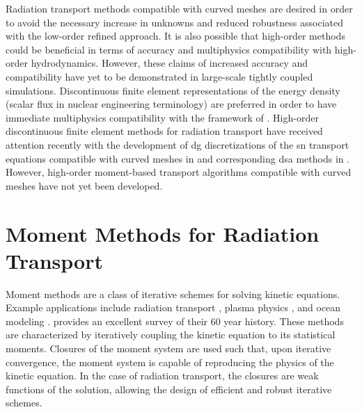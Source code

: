 \documentclass[../doc.tex]{subfiles}
\begin{document}
Radiation transport methods compatible with curved meshes are desired in order to avoid the necessary increase in unknowns and reduced robustness associated with the low-order refined approach. It is also possible that high-order methods could be beneficial in terms of accuracy and multiphysics compatibility with high-order hydrodynamics. However, these claims of increased accuracy and compatibility have yet to be demonstrated in large-scale tightly coupled simulations. Discontinuous finite element representations of the energy density (scalar flux in nuclear engineering terminology) are preferred in order to have immediate multiphysics compatibility with the framework of \cite{blast}. High-order discontinuous finite element methods for radiation transport have received attention recently with the development of \gls{dg} discretizations of the \gls{sn} transport equations compatible with curved meshes in \cite{graph_sweeps,woods_thesis} and corresponding \gls{dsa} methods in \cite{ldrd_dsa,doi:10.1080/00295639.2020.1799603}. 
However, high-order moment-based transport algorithms compatible with curved meshes have not yet been developed. 

\section{Moment Methods for Radiation Transport}
Moment methods are a class of iterative schemes for solving kinetic equations. Example applications include radiation transport \cite{goldin,WINKLER1985145}, plasma physics \cite{MASON1981233}, and ocean modeling \cite{10.1016/j.procs.2015.05.477}. \textcite{CHACON201721} provides an excellent survey of their 60 year history. These methods are characterized by iteratively coupling the kinetic equation to its statistical moments. 
Closures of the moment system are used such that, upon iterative convergence, the moment system is capable of reproducing the physics of the kinetic equation. 
In the case of radiation transport, the closures are weak functions of the solution, allowing the design of efficient and robust iterative schemes. 
\end{document}
